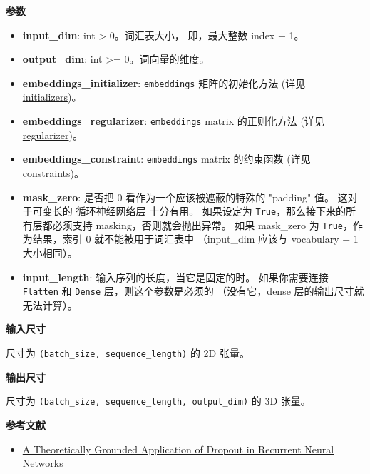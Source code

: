 \textbf{参数}

\begin{itemize}
\tightlist
\item
  \textbf{input\_dim}: int \textgreater{} 0。词汇表大小， 即，最大整数
  index + 1。
\item
  \textbf{output\_dim}: int \textgreater{}= 0。词向量的维度。
\item
  \textbf{embeddings\_initializer}: \texttt{embeddings} 矩阵的初始化方法
  (详见 \hyperref[initializers]{initializers})。
\item
  \textbf{embeddings\_regularizer}: \texttt{embeddings} matrix
  的正则化方法 (详见 \hyperref[regularizers]{regularizer})。
\item
  \textbf{embeddings\_constraint}: \texttt{embeddings} matrix 的约束函数
  (详见 \hyperref[constraints]{constraints})。
\item
  \textbf{mask\_zero}: 是否把 0 看作为一个应该被遮蔽的特殊的 "padding"
  值。 这对于可变长的 \hyperref[recurrent]{循环神经网络层} 十分有用。
  如果设定为 \texttt{True}，那么接下来的所有层都必须支持
  masking，否则就会抛出异常。 如果 mask\_zero 为
  \texttt{True}，作为结果，索引 0 就不能被用于词汇表中 （input\_dim
  应该与 vocabulary + 1 大小相同）。
\item
  \textbf{input\_length}: 输入序列的长度，当它是固定的时。
  如果你需要连接 \texttt{Flatten} 和 \texttt{Dense}
  层，则这个参数是必须的 （没有它，dense 层的输出尺寸就无法计算）。
\end{itemize}

\textbf{输入尺寸}

尺寸为 \texttt{(batch\_size,\ sequence\_length)} 的 2D 张量。

\textbf{输出尺寸}

尺寸为 \texttt{(batch\_size,\ sequence\_length,\ output\_dim)} 的 3D
张量。

\textbf{参考文献}

\begin{itemize}
\tightlist
\item
  \href{http://arxiv.org/abs/1512.05287}{A Theoretically Grounded
  Application of Dropout in Recurrent Neural Networks}
\end{itemize}

\newpage